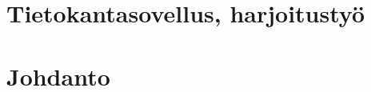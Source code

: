 \documentclass[a4paper]{article}
\begin{document}
\section*{Tietokantasovellus, harjoitustyö}
\section{Johdanto}


%

\end{document}

